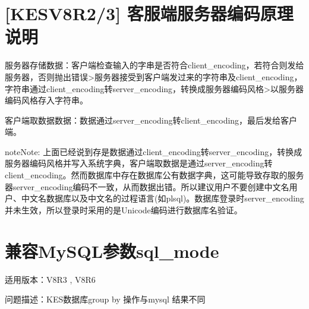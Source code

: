 \documentclass[a4,10pt,oneside,english]{sphinxmanual}
\begin{document}
\begin{sphinxVerbatim}[commandchars=\\\{\}]
                                                                                      
                                                                                                      
        
  
\end{sphinxVerbatim}


\section{{[}KESV8R2/3{]} 客服端服务器编码原理说明}
\label{\detokenize{sql:kesv8r2-3}}
服务器存储数据：客户端检查输入的字串是否符合client\_encoding，若符合则发给服务器，否则抛出错误\sphinxhyphen{}\sphinxhyphen{}>服务器接受到客户端发过来的字符串及client\_encoding，字符串通过client\_encoding转server\_encoding，转换成服务器编码风格\sphinxhyphen{}\sphinxhyphen{}>以服务器编码风格存入字符串。

客户端取数据数据：数据通过server\_encoding转client\_encoding，最后发给客户端。

\begin{sphinxadmonition}{note}{Note:}
上面已经说到存是数据通过client\_encoding转server\_encoding，转换成服务器编码风格并写入系统字典，客户端取数据是通过server\_encoding转client\_encoding。然而数据库中存在数据库公有数据字典，这可能导致存取的服务器server\_encoding编码不一致，从而数据出错。所以建议用户不要创建中文名用户、中文名数据库以及中文名的过程语言(如plsql)。数据库登录时server\_encoding并未生效，所以登录时采用的是Unicode编码进行数据库名验证。
\end{sphinxadmonition}


\section{兼容MySQL参数sql\_mode}
\label{\detokenize{sql:mysqlsql-mode}}
适用版本：V8R3 , V8R6

问题描述：KES数据库group by 操作与mysql 结果不同
\end{document}
